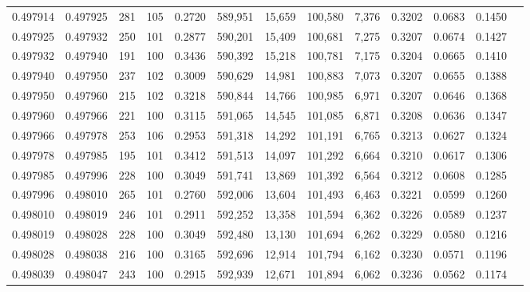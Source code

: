 \begin{tabular}{rrrrrrrrrrrrr}
0.497914 & 0.497925 &   281 & 105 &                                     0.2720 & 589,951 &  15,659 & 100,580 &   7,376 & 0.3202 & 0.0683 & 0.1450 \\
0.497925 & 0.497932 &   250 & 101 &                                     0.2877 & 590,201 &  15,409 & 100,681 &   7,275 & 0.3207 & 0.0674 & 0.1427 \\
0.497932 & 0.497940 &   191 & 100 &                                     0.3436 & 590,392 &  15,218 & 100,781 &   7,175 & 0.3204 & 0.0665 & 0.1410 \\
0.497940 & 0.497950 &   237 & 102 &                                     0.3009 & 590,629 &  14,981 & 100,883 &   7,073 & 0.3207 & 0.0655 & 0.1388 \\
0.497950 & 0.497960 &   215 & 102 &                                     0.3218 & 590,844 &  14,766 & 100,985 &   6,971 & 0.3207 & 0.0646 & 0.1368 \\
0.497960 & 0.497966 &   221 & 100 &                                     0.3115 & 591,065 &  14,545 & 101,085 &   6,871 & 0.3208 & 0.0636 & 0.1347 \\
0.497966 & 0.497978 &   253 & 106 &                                     0.2953 & 591,318 &  14,292 & 101,191 &   6,765 & 0.3213 & 0.0627 & 0.1324 \\
0.497978 & 0.497985 &   195 & 101 &                                     0.3412 & 591,513 &  14,097 & 101,292 &   6,664 & 0.3210 & 0.0617 & 0.1306 \\
0.497985 & 0.497996 &   228 & 100 &                                     0.3049 & 591,741 &  13,869 & 101,392 &   6,564 & 0.3212 & 0.0608 & 0.1285 \\
0.497996 & 0.498010 &   265 & 101 &                                     0.2760 & 592,006 &  13,604 & 101,493 &   6,463 & 0.3221 & 0.0599 & 0.1260 \\
0.498010 & 0.498019 &   246 & 101 &                                     0.2911 & 592,252 &  13,358 & 101,594 &   6,362 & 0.3226 & 0.0589 & 0.1237 \\
0.498019 & 0.498028 &   228 & 100 &                                     0.3049 & 592,480 &  13,130 & 101,694 &   6,262 & 0.3229 & 0.0580 & 0.1216 \\
0.498028 & 0.498038 &   216 & 100 &                                     0.3165 & 592,696 &  12,914 & 101,794 &   6,162 & 0.3230 & 0.0571 & 0.1196 \\
0.498039 & 0.498047 &   243 & 100 &                                     0.2915 & 592,939 &  12,671 & 101,894 &   6,062 & 0.3236 & 0.0562 & 0.1174 \\

\end{tabular}
